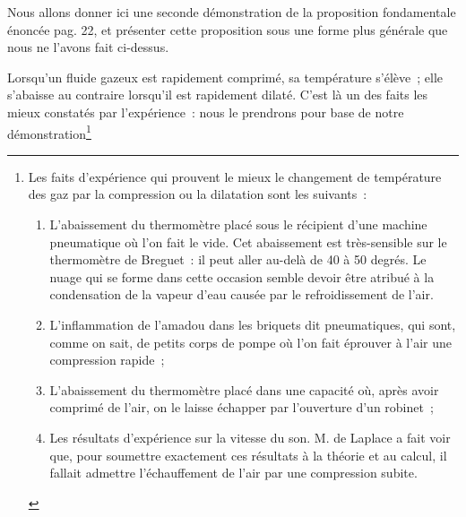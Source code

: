 \documentclass[french,twoside]{book} %
\begin{document}
Nous allons donner ici une seconde démonstration de la proposition fondamentale énoncée pag. 22, et présenter cette proposition sous une forme plus générale que nous ne l’avons fait ci-dessus.\par
Lorsqu’un fluide gazeux est rapidement comprimé, sa température s’élève ; elle s’abaisse au contraire lorsqu’il est rapidement dilaté. C’est là un des faits les mieux constatés par l’expérience : nous le prendrons pour base de notre démonstration\footnote{ \noindent Les faits d’expérience qui prouvent le mieux le changement de température des gaz par la compression ou la dilatation sont les suivants :\par
 
\begin{enumerate}[itemsep=0pt,topsep=0pt,partopsep=0pt,parskip=0pt]
\item L’abaissement du thermomètre placé sous le récipient d’une machine pneumatique où l’on fait le vide. Cet abaissement est très-sensible sur le thermomètre de Breguet : il peut aller au-delà de 40 à 50 degrés. Le nuage qui se forme dans cette occasion semble devoir être atribué à la condensation de la vapeur d’eau causée par le refroidissement de l’air.
\item L’inflammation de l’amadou dans les briquets dit pneumatiques, qui sont, comme on sait, de petits corps de pompe où l’on fait éprouver à l’air une compression rapide ;
\item L’abaissement du thermomètre placé dans une capacité où, après avoir comprimé de l’air, on le laisse échapper par l’ouverture d’un robinet ;
\item Les résultats d’expérience sur la vitesse du son. M. de Laplace a fait voir que, pour soumettre exactement ces résultats à la théorie et au calcul, il fallait admettre l’échauffement de l’air par une compression subite.
\end{enumerate}

}
\end{document}
